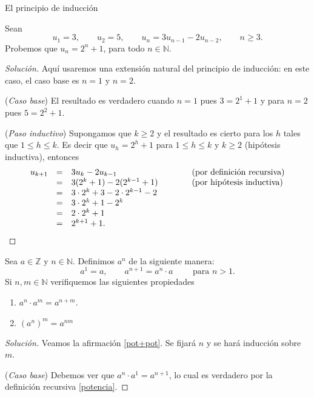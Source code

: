 \begin{section}{El principio de inducción}
\begin{ejemplo*}
Sean $$u_1 = 3,\qquad u_2 = 5,\qquad u_n = 3u_{n-1}- 2u_{n-2},\qquad  n \ge 3.$$
Probemos que $u_n = 2^n + 1$, para todo $n \in  \mathbb N$.
\begin{proof}[Solución] Aquí usaremos una extensión natural del principio de inducción: en este caso, el caso base es $n=1$ y $n=2$.

\noindent(\textit{Caso  base}) El resultado es verdadero cuando $n= 1$ pues $3 = 2^1+1$ y para $n=2$ pues $ 5 =2^2+1$.

\noindent (\textit{Paso  inductivo}) Supongamos que $k \ge 2$ y el resultado  es cierto para los $h$ tales que  $1 \le h \le k$. Es decir que $u_h = 2^h+1$ para $1 \le h \le k$ y $k \ge 2$ (hipótesis inductiva), entonces
$$
\begin{matrix*}[l]u_{k+1} &=& 3u_k -2u_{k-1} \hfill &\qquad &\text{(por definición recursiva)} \hfill \\
&=& 3(2^k+1)-2(2^{k-1}+1) \hfill &\qquad &\text{(por hipótesis inductiva)}\hfill \\
&=& 3\cdot 2^k+3-2\cdot 2^{k-1}-2 \hfill &\qquad & \\
&=& 3\cdot 2^k+1- 2^{k} \hfill &\qquad & \\
&=& 2\cdot 2^k+1 \hfill &\qquad & \\
&=& 2^{k+1}+1. \hfill &\qquad & 
\end{matrix*}
$$
\end{proof}
\end{ejemplo*}


\begin{ejemplo*}
Sea $a \in \mathbb Z$ y $n \in \mathbb N$. Definimos $a^n$ de la siguiente manera:
\begin{equation}\label{potencia}
a^1 = a, \qquad a^{n+1} = a^{n}\cdot a \qquad \text{ para $n >1$.}
\end{equation}
Si $n,m \in \mathbb N$ verifiquemos las siguientes propiedades

\begin{enumerate}[label=\textit{\alph*)}]
\item \label{pot+pot} $a^{n} \cdot a^m = a^{n+m}$.
\item \label{potpot} $(a^n)^m = a^{nm}$
\end{enumerate}
\end{ejemplo*}
\begin{proof}[Solución] 
    Veamos la afirmación \ref{pot+pot}. Se fijará $n$ y se hará inducción sobre $m$. 
    
    \noindent(\textit{Caso  base}) Debemos ver que $a^{n} \cdot a^1 = a^{n+1}$, lo cual es verdadero por la definición recursiva \eqref{potencia}. 
    

\end{proof}
\end{section}
